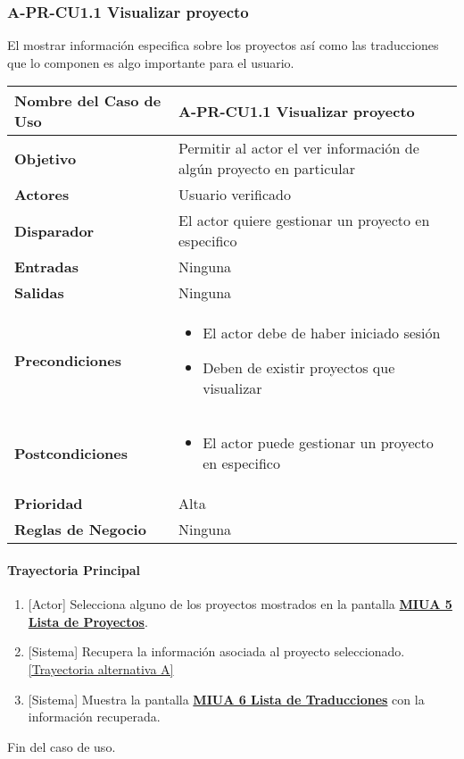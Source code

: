 \subsubsection{A-PR-CU1.1 Visualizar proyecto}
El mostrar información especifica sobre los proyectos así como las traducciones que lo componen es algo importante para el usuario.
\begin{longtable}{|J{5cm}|J{10.3cm}|}
	\hline
	\textbf{Nombre del Caso de Uso} &
		A-PR-CU1.1 Visualizar proyecto \\ \hline
	\textbf{Objetivo} &
		Permitir al actor el ver información de algún proyecto en particular \\ \hline
	\textbf{Actores} &
		Usuario verificado \\ \hline 
	\textbf{Disparador} & 
		El actor quiere gestionar un proyecto en especifico \\ \hline 
	\textbf{Entradas} & 
		Ninguna \\ \hline 
	\textbf{Salidas} & 
		Ninguna \\ \hline
	\textbf{Precondiciones} &
		\begin{itemize}
				\item El actor debe de haber iniciado sesión
				\item Deben de existir proyectos que visualizar
		\end{itemize} \\ \hline
	\textbf{Postcondiciones} &
		\begin{itemize}
			\item El actor puede gestionar un proyecto en especifico
		\end{itemize}\\ \hline
	\textbf{Prioridad} & 
		Alta \\ \hline
	\textbf{Reglas de Negocio} & 
		Ninguna \\ \hline

\end{longtable}
\paragraph{Trayectoria Principal}
	\begin{enumerate}
	    \item {[Actor]} Selecciona alguno de los proyectos mostrados en la pantalla \hyperref[fig:MIUA-5]{\bf MIUA 5 Lista de Proyectos}.
	    \item {[Sistema]} Recupera la información asociada al proyecto seleccionado. \hyperref[A-PR-CU1.1:TA]{[Trayectoria alternativa A]}
	    \item {[Sistema]} Muestra la pantalla \hyperref[fig:MIUA-6]{\bf MIUA 6 Lista de Traducciones} con la información recuperada.
	\end{enumerate}
	Fin del caso de uso.


